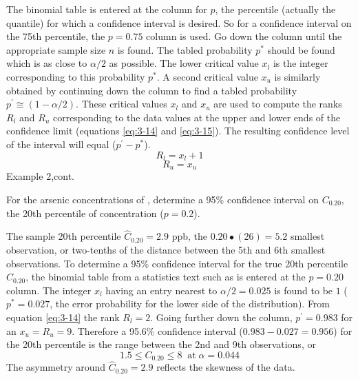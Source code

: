 \documentclass[]{book}
\begin{document}
The binomial table is entered at the column for \(p\), the percentile (actually the quantile) for which a confidence interval is desired. So for a confidence interval on the 75th percentile, the \(p = 0.75\) column is used. Go down the column until the appropriate sample size \(n\) is found. The tabled probability \(p^{*}\) should be found which is as close to \(\alpha / 2\) as possible. The lower critical value \(x_{l}\) is the integer corresponding to this probability \(p^{*}\). A second critical value \(x_{u}\) is similarly obtained by continuing down the column to find a tabled probability \(p^{\prime} \cong (1 − \alpha / 2)\). These critical values \(x_{l}\) and \(x_{u}\) are used to compute the ranks \(R_{l}\) and \(R_{u}\) corresponding to the data values at the upper and lower ends of the confidence limit (equations \eqref{eq:3-14} and \eqref{eq:3-15}). The resulting confidence level of the interval will equal (\(p^{\prime} − p^{*}\)).
\begin{equation}
R_{l} = x_{l} +1
\label{eq:3-14}
\end{equation}
\begin{equation}
R_{u} = x_{u}
\label{eq:3-15}
\end{equation}
Example 2,cont.

For the arsenic concentrations of \citet{boudette_high_1985}, determine a 95\% confidence interval on \(C_{0.20}\), the 20th percentile of concentration (\(p = 0.2\)).

The sample 20th percentile \(\hat{C}_{0.20} = 2.9\) ppb, the \(0.20 \bullet (26) = 5.2\) smallest observation, or two-tenths of the distance between the 5th and 6th smallest observations. To determine a 95\% confidence interval for the true 20th percentile \(C_{0.20}\), the binomial table from a statistics text such as \citet{bhattacharyya_statistical_1977} is entered at the \(p = 0.20\) column. The integer \(x_{l}\) having an entry nearest to \(\alpha / 2 = 0.025\) is found to be \(1\) (\(p^{*} = 0.027\), the error probability for the
lower side of the distribution). From equation \eqref{eq:3-14} the rank \(R_{l} = 2\). Going further down the column, \(p^{\prime} = 0.983\) for an \(x_{u} = R_{u} = 9\). Therefore a 95.6\% confidence interval (\(0.983 − 0.027 = 0.956\)) for the 20th percentile is the range between the 2nd and 9th observations, or \[1.5 \leq C_{0.20} \leq 8 \;\; \text{at} \; \alpha = 0.044\] The asymmetry around \(\hat{C}_{0.20} = 2.9\) reflects the skewness of the data.
\end{document}
